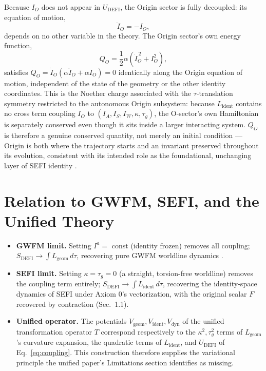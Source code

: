 \documentclass[aip,jmp,reprint,onecolumn,nofootinbib]{revtex4-2}
\begin{document}
Because $I_O$ does not appear in $U_{\text{DEFI}}$, the Origin sector is fully
decoupled: its equation of motion,
\begin{equation}
\ddot I_O = -I_O,
\end{equation}
depends on no other variable in the theory. The Origin sector's own energy
function,
\begin{equation}
Q_O = \frac{1}{2}\alpha\left(\dot I_O^{\,2} + I_O^2\right),
\end{equation}
satisfies $\dot Q_O = \dot I_O\left(\alpha \ddot I_O + \alpha I_O\right) = 0$
identically along the Origin equation of motion, independent of the state of the
geometry or the other identity coordinates. This is the Noether charge
\cite{Noether1918,Noether1971} associated
with the $\tau$-translation symmetry restricted to the autonomous Origin
subsystem: because $L_\text{ident}$ contains no cross term coupling $I_O$ to
$(I_A,I_S,I_W,\kappa,\tau_g)$, the O-sector's own Hamiltonian is separately
conserved even though it sits inside a larger interacting system. $Q_O$ is
therefore a genuine conserved quantity, not merely an initial condition --- Origin
is both where the trajectory starts and an invariant preserved throughout its
evolution, consistent with its intended role as the foundational, unchanging
layer of SEFI identity \cite{DuttonSEFI2026}.

\section{Relation to GWFM, SEFI, and the Unified Theory}

\begin{itemize}
\item \textbf{GWFM limit.} Setting $I^a=$ const (identity frozen) removes all
coupling; $S_{\text{DEFI}}\to \int L_{\text{geom}}\,d\tau$, recovering pure GWFM
worldline dynamics \cite{DuttonElectronField2026}.
\item \textbf{SEFI limit.} Setting $\kappa=\tau_g=0$ (a straight, torsion-free
worldline) removes the coupling term entirely; $S_{\text{DEFI}}\to\int
L_{\text{ident}}\,d\tau$, recovering the identity-space dynamics of SEFI under
Axiom 0's vectorization, with the original scalar $F$ recovered by contraction
(Sec.~1.1).
\item \textbf{Unified operator.} The potentials $V_{\text{geom}}, V_{\text{ident}},
V_{\text{dyn}}$ of the unified transformation operator $T$
\cite{DuttonUnified2026} correspond respectively to the $\kappa^2,\tau_g^2$ terms
of $L_{\text{geom}}$'s curvature expansion, the quadratic terms of
$L_{\text{ident}}$, and $U_{\text{DEFI}}$ of Eq.~\eqref{eq:coupling}. This
construction therefore supplies the variational principle the unified paper's
Limitations section identifies as missing.
\end{itemize}
\end{document}
